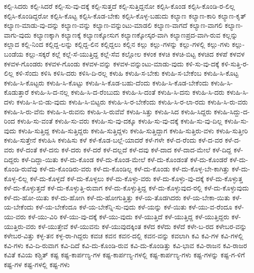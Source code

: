 {ಕಲ್ಪಿ-ಸಿದರು
ಕಲ್ಪಿ-ಸಿದರೆ
ಕಲ್ಪಿ-ಸು-ವು-ದಕ್ಕೆ
ಕಲ್ಪಿ-ಸುತ್ತದೆ
ಕಲ್ಪಿ-ಸುತ್ತಿದ್ದನೋ
ಕಲ್ಪಿಸಿ-ಕೊಂಡ
ಕಲ್ಪಿಸಿ-ಕೊಂಡಿ-ರ-ಲಿಲ್ಲ
ಕಲ್ಪಿಸಿ-ಕೊಂಡಿದ್ದರೋ
ಕಲ್ಪಿಸಿ-ಕೊಟ್ಟ
ಕಲ್ಪಿಸಿ-ಕೊಡ-ಬೇಕು
ಕಲ್ಪಿಸಿ-ಕೊಳ್ಳ-ಬಹುದು
ಕಲ್ಯಾಣ
ಕಲ್ಯಾಣ-ಕಾರಿ
ಕಲ್ಯಾಣ-ಕೃತ್
ಕಲ್ಯಾಣ-ಮಾಡು-ವು-ದನ್ನು
ಕಲ್ಯಾಣ-ವನ್ನು
ಕಲ್ಯಾಣ-ವನ್ನುಂಟು-ಮಾಡಲಿ
ಕಲ್ಯಾಣ-ವಾಗದೆ
ಕಲ್ಯಾಣ-ವಾಗಲಿ
ಕಲ್ಯಾಣ-ವಾಗು-ವುದು
ಕಲ್ಯಾಣಕ್ಕಾಗಿ
ಕಲ್ಯಾಣಕ್ಕೆ
ಕಲ್ಯಾಣಕ್ಕೋಸುಗ
ಕಲ್ಯಾಣಕ್ಕೋಸ್ಕರ-ವಾಗಿ
ಕಲ್ಯಾಣಪ್ರದ-ವಾಗಿ-ರುವ
ಕಲ್ಲನ್ನು
ಕಲ್ಲಾದ
ಕಲ್ಲಿ-ನಿಂದ
ಕಲ್ಲಿದ್ದ-ಲನ್ನು
ಕಲ್ಲಿದ್ದ-ಲಿನ
ಕಲ್ಲಿದ್ದಲು
ಕಲ್ಲಿನ
ಕಲ್ಲು
ಕಲ್ಲು-ಗಳನ್ನು
ಕಲ್ಲು-ಗಳಲ್ಲಿ
ಕಲ್ಲು-ಗಳು
ಕಲ್ಲು-ಬಂಡೆಯ
ಕಲ್ಲು-ಸಕ್ಕರೆ
ಕಲ್ಲೆ
ಕಲ್ಲೆ-ಸೆ-ಯುತ್ತಿದ್ದ
ಕಲ್ಲೆ-ಸೆವ
ಕಲ್ಲೋಲ
ಕಳಂಕ
ಕಳಚಿ
ಕಳಚಿ-ಬಿಟ್ಟ
ಕಳಚಿದ
ಕಳಪೆ
ಕಳವಳ
ಕಳವಳ-ಗೊಂಡರು
ಕಳವಳ-ಗೊಂಡು
ಕಳವಳ-ವನ್ನು
ಕಳವಳ-ವನ್ನುಂಟು-ಮಾಡು-ವುದು
ಕಳಿ-ಸು-ವು-ದಕ್ಕೆ
ಕಳಿ-ಸುತ್ತಿ-ರ-ಲಿಲ್ಲ
ಕಳಿ-ಸೆಂದು
ಕಳಿಸಿ
ಕಳಿಸಿ-ದರು
ಕಳಿಸಿ-ದಿ-ರಲ್ಲ
ಕಳುಹಿ
ಕಳುಹಿ-ಸ-ಬೇಕು
ಕಳುಹಿ-ಸ-ಬೇಕೆಂಬ
ಕಳುಹಿ-ಸಿ-ಕೊಟ್ಟ
ಕಳುಹಿ-ಸಿ-ಕೊಟ್ಟರು
ಕಳುಹಿ-ಸಿ-ಕೊಟ್ಟು
ಕಳುಹಿ-ಸಿ-ಕೊಡ-ಬಹು-ದೆಂದು
ಕಳುಹಿ-ಸಿ-ಕೊಡ-ಬೇಕೆಂದು
ಕಳುಹಿ-ಸಿ-ಕೊಡುತ್ತಾರೆ
ಕಳುಹಿ-ಸಿ-ದ-ನಲ್ಲ
ಕಳುಹಿ-ಸಿ-ದ-ರೆಂಬುದು
ಕಳುಹಿ-ಸಿ-ದಂತೆ
ಕಳುಹಿ-ಸಿ-ದನು
ಕಳುಹಿ-ಸಿ-ದರು
ಕಳುಹಿ-ಸಿ-ದಳು
ಕಳುಹಿ-ಸಿ-ಬಿ-ಡು-ವುದು
ಕಳುಹಿ-ಸಿ-ಬಿಟ್ಟರು
ಕಳುಹಿ-ಸಿ-ರ-ಬೇಕೆಂದು
ಕಳುಹಿ-ಸಿ-ರ-ಲಾ-ರದು
ಕಳುಹಿ-ಸಿ-ರು-ವರು
ಕಳುಹಿ-ಸಿ-ರು-ವೆನು
ಕಳುಹಿ-ಸಿ-ರುವನು
ಕಳುಹಿ-ಸಿ-ರುವೆವೆ
ಕಳುಹಿ-ಸಿತ್ತು
ಕಳುಹಿ-ಸಿದ
ಕಳುಹಿ-ಸಿದ್ದರು
ಕಳುಹಿ-ಸಿದ್ದು-ದ-ರಿಂದ
ಕಳುಹಿ-ಸು-ವಂತೆ
ಕಳುಹಿ-ಸು-ವರು
ಕಳುಹಿ-ಸು-ವು-ದಕ್ಕೂ
ಕಳುಹಿ-ಸು-ವು-ದಕ್ಕೆ
ಕಳುಹಿ-ಸು-ವು-ದಿಲ್ಲ
ಕಳುಹಿ-ಸು-ವುದು
ಕಳುಹಿ-ಸುತ್ತಿದ್ದ
ಕಳುಹಿ-ಸುತ್ತಿದ್ದರು
ಕಳುಹಿ-ಸುತ್ತಿದ್ದಳು
ಕಳುಹಿ-ಸುತ್ತಿದ್ದಾಗ
ಕಳುಹಿ-ಸುತ್ತಿರು-ವಳು
ಕಳುಹಿ-ಸುತ್ತೀರಿ
ಕಳುಹಿ-ಸುತ್ತೇನೆ
ಕಳುಹಿಸಿ
ಕಳುಹಿಸು
ಕಳೆ
ಕಳೆ-ಕೊಡ-ಬಲ್ಲೆ-ಯಾದರೆ
ಕಳೆ-ಗಳೇ
ಕಳೆ-ದ-ರೆಂದು
ಕಳೆ-ದ-ವರ
ಕಳೆ-ದ-ವರು
ಕಳೆ-ದಂತೆ
ಕಳೆ-ದನು
ಕಳೆ-ದರು
ಕಳೆ-ದರೆ
ಕಳೆ-ದಲ್ಲದೆ
ಕಳೆ-ದವು
ಕಳೆ-ದಾದ
ಕಳೆ-ದಾದ-ಮೇಲೆ
ಕಳೆ-ದಿದ್ದ
ಕಳೆ-ದಿದ್ದರು
ಕಳೆ-ದಿದ್ದಾ-ಯಿತು
ಕಳೆ-ದು-ಕೊಂಡ
ಕಳೆ-ದು-ಕೊಂಡ-ಮೇಲೆ
ಕಳೆ-ದು-ಕೊಂಡಂತೆ
ಕಳೆ-ದು-ಕೊಂಡರೆ
ಕಳೆ-ದು-ಕೊಂಡಿ-ರುವೆವು
ಕಳೆ-ದು-ಕೊಂಡಿರು-ವರು
ಕಳೆ-ದು-ಕೊಂಡಿಲ್ಲ
ಕಳೆ-ದು-ಕೊಂಡು
ಕಳೆ-ದು-ಕೊಳ್ಳ-ಬೇ-ಕಾಗಿತ್ತು
ಕಳೆ-ದು-ಕೊಳ್ಳ-ಲಿಲ್ಲ
ಕಳೆ-ದು-ಕೊಳ್ಳದೆ
ಕಳೆ-ದು-ಕೊಳ್ಳಲು
ಕಳೆ-ದು-ಕೊಳ್ಳು-ವರು
ಕಳೆ-ದು-ಕೊಳ್ಳು-ವು-ದಕ್ಕೆ
ಕಳೆ-ದು-ಕೊಳ್ಳುತ್ತ
ಕಳೆ-ದು-ಕೊಳ್ಳುತ್ತದೆ
ಕಳೆ-ದು-ಕೊಳ್ಳುತ್ತಿ-ರುವಾಗ
ಕಳೆ-ದು-ಕೊಳ್ಳುತ್ತಿದ್ದ
ಕಳೆ-ದು-ಕೊಳ್ಳುವುದ-ರಲ್ಲಿ
ಕಳೆ-ದು-ಕೊಳ್ಳುವುದು
ಕಳೆ-ದು-ಹೋ-ಯಿತು
ಕಳೆ-ದು-ಹೋಗಿ
ಕಳೆ-ದು-ಹೋಗುತ್ತಿತ್ತು
ಕಳೆ-ಯ-ತೊಡಗಿದರು
ಕಳೆ-ಯ-ಬೇಕಾ-ಯಿತು
ಕಳೆ-ಯ-ಬೇಕೆಂದು
ಕಳೆ-ಯ-ಬೇಕೆಂದೂ
ಕಳೆ-ಯ-ಬೇಕೆನ್ನಿ-ಸು-ವುದು
ಕಳೆ-ಯನ್ನು
ಕಳೆ-ಯಿತು
ಕಳೆ-ಯು-ವ-ರೆಂದೂ
ಕಳೆ-ಯು-ವರು
ಕಳೆ-ಯು-ವಿರಿ
ಕಳೆ-ಯು-ವು-ದಕ್ಕೆ
ಕಳೆ-ಯು-ವುದು
ಕಳೆ-ಯುತ್ತಿದೆ
ಕಳೆ-ಯುತ್ತಿದ್ದ
ಕಳೆ-ಯುತ್ತಿದ್ದರು
ಕಳೆ-ಯುತ್ತಿರು-ವರು
ಕಳೆ-ಯುತ್ತೇವೆ
ಕಳೆ-ಯುವನು
ಕಳೆ-ಯುವುದಕ್ಕಿಂತ
ಕಳೆದ
ಕಳೆದು
ಕಳೆದೆ
ಕಳೇ-ಬ-ರದ
ಕಳೇಬರ-ವನ್ನು
ಕಳೇಬರ-ವಿತ್ತು
ಕಳ್ಳ-ತನ
ಕಳ್ಳ-ರಾ-ಗಿದ್ದರು
ಕವಚ
ಕವನ
ಕವನ-ದಲ್ಲಿ
ಕವನ-ವನ್ನು
ಕವಲಾಗಿ
ಕವಿ
ಕವಿ-ಗಳ
ಕವಿ-ಗಳಲ್ಲಿ
ಕವಿ-ಗಳು
ಕವಿ-ದಿ-ರುವಾಗ
ಕವಿ-ದಿದೆ
ಕವಿ-ದು-ಕೊಂಡಿ-ರುವ
ಕವಿ-ದು-ಕೊಂಡಿತ್ತು
ಕವಿ-ಭಾವ
ಕವಿ-ರಾಜನ
ಕವಿ-ರಾಜರ
ಕವಿತೆ
ಕವಿಯ
ಕಶ್ಚಿತ್
ಕಷ್ಟ
ಕಷ್ಟ-ಕಾರ್ಪಣ್ಯ-ಗಳ
ಕಷ್ಟ-ಕಾರ್ಪಣ್ಯ-ಗಳಲ್ಲಿ
ಕಷ್ಟ-ಕಾರ್ಪಣ್ಯ-ಗಳು
ಕಷ್ಟ-ಗಳನ್ನು
ಕಷ್ಟ-ಗ-ಳಿಗೆ
ಕಷ್ಟ-ಗಳ
ಕಷ್ಟ-ಗಳಲ್ಲಿ
ಕಷ್ಟ-ಗಳು
}

